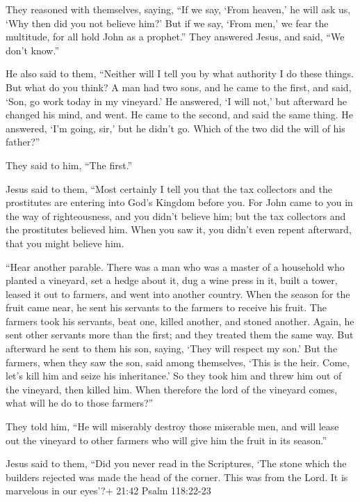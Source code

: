 They reasoned with themselves, saying, ``If we say, `From heaven,' he
will ask us, `Why then did you not believe him?'  But if we
say, `From men,' we fear the multitude, for all hold John as a
prophet.''  They answered Jesus, and said, ``We don't
know.''

He also said to them, ``Neither will I tell you by what authority I do
these things.  But what do you think? A man had two sons,
and he came to the first, and said, `Son, go work today in my vineyard.'
 He answered, `I will not,' but afterward he changed his
mind, and went.  He came to the second, and said the same
thing. He answered, `I'm going, sir,' but he didn't go. 
Which of the two did the will of his father?''

They said to him, ``The first.''

Jesus said to them, ``Most certainly I tell you that the tax collectors
and the prostitutes are entering into God's Kingdom before you.
 For John came to you in the way of righteousness, and you
didn't believe him; but the tax collectors and the prostitutes believed
him. When you saw it, you didn't even repent afterward, that you might
believe him.

 ``Hear another parable. There was a man who was a master
of a household who planted a vineyard, set a hedge about it, dug a wine
press in it, built a tower, leased it out to farmers, and went into
another country.  When the season for the fruit came near,
he sent his servants to the farmers to receive his fruit. 
The farmers took his servants, beat one, killed another, and stoned
another.  Again, he sent other servants more than the
first; and they treated them the same way.  But afterward
he sent to them his son, saying, `They will respect my son.'
 But the farmers, when they saw the son, said among
themselves, `This is the heir. Come, let's kill him and seize his
inheritance.'  So they took him and threw him out of the
vineyard, then killed him.  When therefore the lord of the
vineyard comes, what will he do to those farmers?''

 They told him, ``He will miserably destroy those miserable
men, and will lease out the vineyard to other farmers who will give him
the fruit in its season.''

 Jesus said to them, ``Did you never read in the
Scriptures, `The stone which the builders rejected was made the head of
the corner. This was from the Lord. It is marvelous in our eyes'?+ 21:42
Psalm 118:22-23

